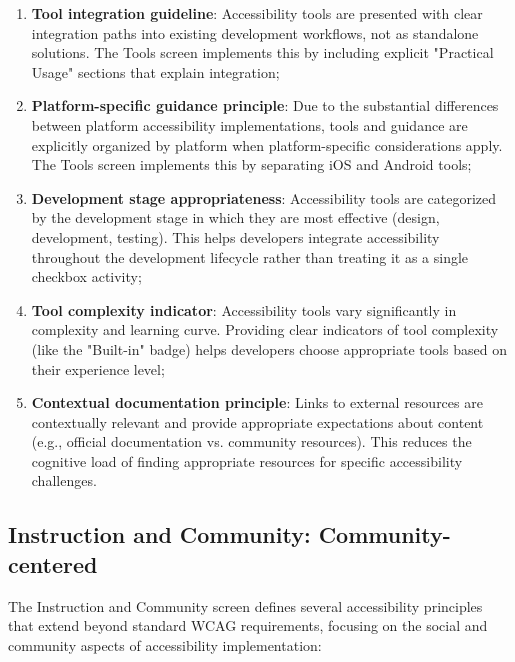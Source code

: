 \begin{enumerate}
    \item \textbf{Tool integration guideline}: Accessibility tools are presented with clear integration paths into existing development workflows, not as standalone solutions. The Tools screen implements this by including explicit "Practical Usage" sections that explain integration;
    
    \item \textbf{Platform-specific guidance principle}: Due to the substantial differences between platform accessibility implementations, tools and guidance are explicitly organized by platform when platform-specific considerations apply. The Tools screen implements this by separating iOS and Android tools;
    
    \item \textbf{Development stage appropriateness}: Accessibility tools are categorized by the development stage in which they are most effective (design, development, testing). This helps developers integrate accessibility throughout the development lifecycle rather than treating it as a single checkbox activity;
    
    \item \textbf{Tool complexity indicator}: Accessibility tools vary significantly in complexity and learning curve. Providing clear indicators of tool complexity (like the "Built-in" badge) helps developers choose appropriate tools based on their experience level;
    
    \item \textbf{Contextual documentation principle}: Links to external resources are contextually relevant and provide appropriate expectations about content (e.g., official documentation vs. community resources). This reduces the cognitive load of finding appropriate resources for specific accessibility challenges.
\end{enumerate}

\subsection{Instruction and Community: Community-centered}

The Instruction and Community screen defines several accessibility principles that extend beyond standard WCAG requirements, focusing on the social and community aspects of accessibility implementation:

